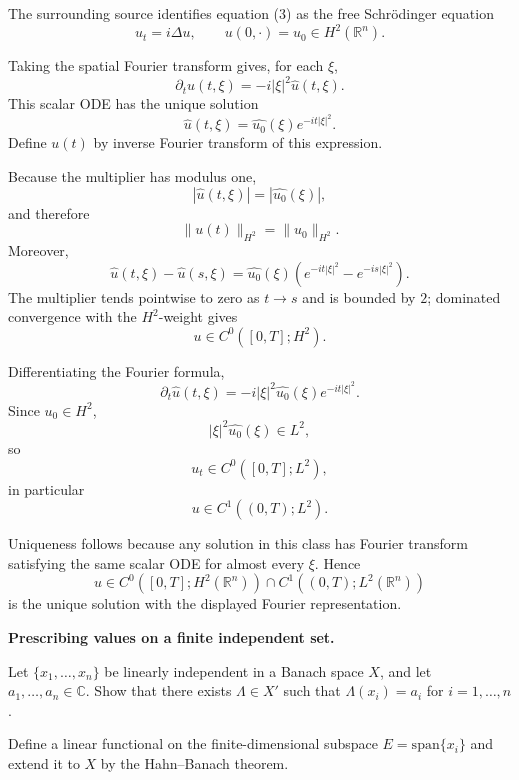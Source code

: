 \begin{solution}
The surrounding source identifies equation (3) as the free Schrödinger equation
\[
u_t=i\Delta u,
\qquad
u(0,\cdot)=u_0\in H^2(\mathbb R^n).
\]

Taking the spatial Fourier transform gives, for each \(\xi\),
\[
\partial_t\widehat u(t,\xi)
=
-i|\xi|^2\widehat u(t,\xi).
\]
This scalar ODE has the unique solution
\[
\boxed{
\widehat u(t,\xi)
=
\widehat{u_0}(\xi)e^{-it|\xi|^2}.
}
\]
Define \(u(t)\) by inverse Fourier transform of this expression.

Because the multiplier has modulus one,
\[
|\widehat u(t,\xi)|
=
|\widehat{u_0}(\xi)|,
\]
and therefore
\[
\|u(t)\|_{H^2}
=
\|u_0\|_{H^2}.
\]
Moreover,
\[
\widehat u(t,\xi)
-
\widehat u(s,\xi)
=
\widehat{u_0}(\xi)
\left(
e^{-it|\xi|^2}-e^{-is|\xi|^2}
\right).
\]
The multiplier tends pointwise to zero as \(t\to s\) and is bounded by \(2\); dominated
convergence with the \(H^2\)-weight gives
\[
u\in C^0([0,T];H^2).
\]

Differentiating the Fourier formula,
\[
\partial_t\widehat u(t,\xi)
=
-i|\xi|^2
\widehat{u_0}(\xi)e^{-it|\xi|^2}.
\]
Since \(u_0\in H^2\),
\[
|\xi|^2\widehat{u_0}(\xi)\in L^2,
\]
so
\[
u_t\in C^0([0,T];L^2),
\]
in particular
\[
u\in C^1((0,T);L^2).
\]

Uniqueness follows because any solution in this class has Fourier transform satisfying the
same scalar ODE for almost every \(\xi\). Hence
\[
\boxed{
u\in
C^0([0,T];H^2(\mathbb R^n))
\cap
C^1((0,T);L^2(\mathbb R^n))
}
\]
is the unique solution with the displayed Fourier representation.
\end{solution}


\begin{problem}[CP-II-0281]
\label{prob:cp-ii-0281}
\textbf{Prescribing values on a finite independent set.}

\hspace*{1.5em}Let $\{x_1,\dots,x_n\}$ be linearly independent in a Banach space $X$, and let $a_1,\dots,a_n\in\mathbb C$.
	Show that there exists $\Lambda\in X'$ such that $\Lambda(x_i)=a_i$ for $i=1,\dots,n$.

	Define a linear functional on the finite-dimensional subspace $E=\mathrm{span}\{x_i\}$ and extend it to $X$
	by the Hahn--Banach theorem.
\end{problem}

